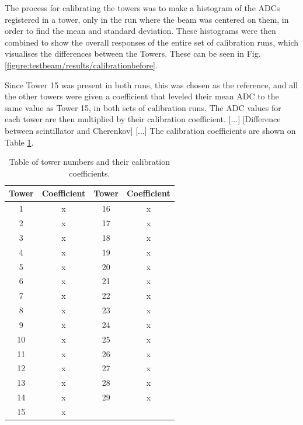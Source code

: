 
The process for calibrating the towers was to make a histogram of the ADCs registered in a tower, only in the run where the beam was centered on them, in order to find the mean and standard deviation. These histograms were then combined to show the overall responses of the entire set of calibration runs, which visualises the differences between the Towers. These can be seen in Fig. \ref{figure:testbeam/results/calibrationbefore}. 

Since Tower 15 was present in both runs, this was chosen as the reference, and all the other towers were given a coefficient that leveled their mean ADC to the same value as Tower 15, in both sets of calibration runs. The ADC values for each tower are then multiplied by their calibration coefficient. [...] [Difference between scintillator and Cherenkov] [...] The calibration coefficients are shown on Table \ref{table:idea/calibrationcoeffs}.

\begin{table}[h]
\centering
	\begin{tabular}{ c c | c c }
	\hline \hline
	\textbf{Tower} & \textbf{Coefficient} & \textbf{Tower} & \textbf{Coefficient} \\ \hline \hline
	 1 & x & 16 & x \\
	 2 & x & 17 & x \\
	 3 & x & 18 & x \\
	 4 & x & 19 & x \\
	 5 & x & 20 & x \\
	 6 & x & 21 & x \\
	 7 & x & 22 & x \\
	 8 & x & 23 & x \\
	 9 & x & 24 & x \\
	10 & x & 25 & x \\
	11 & x & 26 & x \\
	12 & x & 27 & x \\
	13 & x & 28 & x \\
	14 & x & 29 & x \\
	15 & x &    &    \\ \hline
	\end{tabular}
	\caption{Table of tower numbers and their calibration coefficients.}
	\label{table:idea/calibrationcoeffs}
\end{table}

